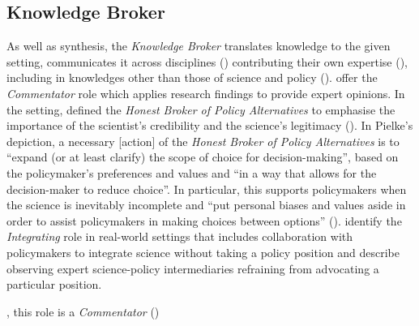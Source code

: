 \subsection{Knowledge Broker}
As well as synthesis, the \emph{Knowledge Broker} translates knowledge to the given setting, communicates it across disciplines (\cite{GogginEtAl2015}) contributing their own expertise (\cite{RapleyD2014}), including in knowledges other than those of science and policy (\cite{Gluckman2014}). \textcite{KarkkainenLKK2024} offer the \emph{Commentator} role which applies research findings to provide expert opinions. In the \SPI{} setting, \textcite{Pielke2007} defined the \emph{Honest Broker of Policy Alternatives} to emphasise the importance of the scientist's credibility and the science's legitimacy (\cite{DuncanRE2020}). In Pielke's depiction, a necessary [action] of the \emph{Honest Broker of Policy Alternatives} is to ``expand (or at least clarify) the scope of choice for decision-making'', based on the policymaker's preferences and values and ``in a way that allows for the decision-maker to reduce choice''. In particular, this supports policymakers when the science is inevitably incomplete and ``put personal biases and values aside in order to assist policymakers in making choices between options'' (\cite{GluckmanBK2021}). \textcite{SteelLLS2004,SinghTKMMC2014} identify the \emph{Integrating} role in real-world settings that includes collaboration with policymakers to integrate science without taking a policy position and \textcite{BednarekSHG2015} describe observing expert science-policy intermediaries refraining from advocating a particular position.

, this role is a \emph{Commentator} (\cite{KarkkainenLKK2024})

